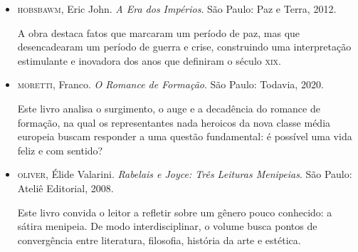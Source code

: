 \documentclass{article}
\begin{document}
\begin{itemize}
\item\textsc{hobsbawm}, Eric John. \textit{A Era dos Impérios}. São Paulo: Paz e
Terra, 2012.

A obra destaca fatos que marcaram um período de paz, mas que
desencadearam um período de guerra e crise, construindo uma
interpretação estimulante e inovadora dos anos que definiram o século
\textsc{xix}.

\item\textsc{moretti}, Franco. \textit{O Romance de Formação}. São Paulo: Todavia,
2020.

Este livro analisa o surgimento, o auge e a decadência do romance de
formação, na qual os representantes nada heroicos da nova classe média
europeia buscam responder a uma questão fundamental: é possível uma vida
feliz e com sentido?

\item\textsc{oliver}, Élide Valarini. \textit{Rabelais e Joyce: Três Leituras
Menipeias}. São Paulo: Ateliê Editorial, 2008.

Este livro convida o leitor a refletir sobre um gênero pouco conhecido:
a sátira menipeia. De modo interdisciplinar, o volume busca pontos de
convergência entre literatura, filosofia, história da arte e estética.
\end{itemize}
\end{document}
